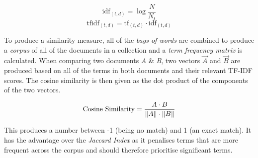 \documentclass[../report.tex]{subfiles}
\begin{document}
	$$ \text{idf}_{(t,d)} = \log{\frac{N}{N_{t}}}$$
	$$ \text{tfidf}_{(t, d)} = \text{tf}_{(t,d)} \cdot \text{idf}_{(t,d)} $$
	
	To produce a similarity measure, all of the \textit{bags of words} are combined to produce a \textit{corpus} of all of the documents in a collection and a \textit{term frequency matrix} is calculated.  When comparing two documents \textit{A} \& \textit{B}, two vectors $\overrightarrow{A}$ and $\overrightarrow{B}$ are produced based on all of the terms in both documents and their relevant TF-IDF scores.  The cosine similarity is then given as the dot product of the components of the two vectors.
	
	$$ \text{Cosine Similarity} = \frac{A \cdot B}{\norm{A} \cdot \norm{B}} $$
	
	This produces a number between -1 (being no match) and 1 (an exact match).  It has the advantage over the \textit{Jaccard Index} as it penalises terms that are more frequent across the corpus and should therefore prioritise significant terms.
\end{document}
